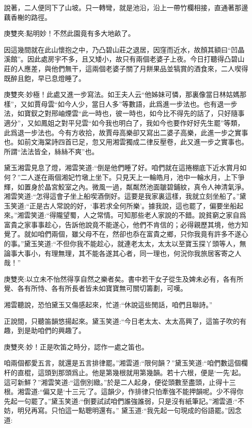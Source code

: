 \begin{parag}
    說著，二人便同下了山坡。只一轉彎，就是池沿，沿上一帶竹欄相接，直通著那邊藕香榭的路徑。\begin{note}庚雙夾:點明妙！不然此園竟有多大地畝了。\end{note}因這幾間就在此山懷抱之中，乃凸碧山莊之退居，因窪而近水，故顏其額曰“凹晶溪館”。因此處房宇不多，且又矮小，故只有兩個老婆子上夜。今日打聽得凸碧山莊的人應差，與他們無干，這兩個老婆子關了月餅果品並犒賞的酒食來，二人喫得既醉且飽，早已息燈睡了。\begin{note}庚雙夾:妙極！此處又進一步寫法。如王夫人云“他姊妹可憐，那裏像當日林姑媽那樣”，又如賈母雲“如今人少，當日人多”等數語，此爲進一步法也。也有退一步法，如寶釵之對邢岫煙雲“此一時也，彼一時也，如今比不得先的話了，只好隨事適分”，又如鳳姐之對平兒雲“如今我也明白了，我如今也要作好好先生罷”等類，此爲退一步法也。今有方收拾，故賈母高樂卻又寫出二婆子高樂，此進一步之實事也。如前文海棠詩四首已足，忽又用湘雲獨成二律反壓卷，此又進一步之實事也。所謂“法法皆全，絲絲不爽”也。\end{note}
\end{parag}


\begin{parag}
    黛玉湘雲見息了燈，湘雲笑道:“倒是他們睡了好。咱們就在這捲棚底下近水賞月如何？”二人遂在兩個湘妃竹墩上坐下。只見天上一輪皓月，池中一輪水月，上下爭輝，如置身於晶宮鮫室之內。微風一過，粼粼然池面皺碧鋪紋，真令人神清氣淨。湘雲笑道:“怎得這會子坐上船喫酒倒好。這要是我家裏這樣，我就立刻坐船了。”黛玉笑道:“正是古人常說的好，‘事若求全何所樂’。據我說，這也罷了，偏要坐船起來。”湘雲笑道:“得隴望蜀，人之常情。可知那些老人家說的不錯。說貧窮之家自爲富貴之家事事趁心，告訴他說竟不能遂心，他們不肯信的；必得親歷其境，他方知覺了。就如咱們兩個，雖父母不在，然卻也忝在富貴之鄉，只你我竟有許多不遂心的事。”黛玉笑道:“不但你我不能趁心，就連老太太，太太以至寶玉探丫頭等人，無論事大事小，有理無理，其不能各遂其心者，同一理也，何況你我旅居客寄之人哉！”\begin{note}庚雙夾:以立未不怡然得享自然之樂者矣。書中若干女子從生及婢未必有，各有所覺、各有所恃、各有所長者皆未如寶寶無可關切籌劃，可嘆。\end{note}湘雲聽說，恐怕黛玉又傷感起來，忙道:“休說這些閒話，咱們且聯詩。”
\end{parag}


\begin{parag}
    正說間，只聽笛韻悠揚起來。黛玉笑道:“今日老太太、太太高興了，這笛子吹的有趣，到是助咱們的興趣了。\begin{note}庚雙夾:妙！正是吹笛之時分，認作一處之笛也。\end{note}咱兩個都愛五言，就還是五言排律罷。”湘雲道:“限何韻？”黛玉笑道:“咱們數這個欄杆的直棍，這頭到那頭爲止。他是第幾根就用第幾韻。若十六根，便是‘一先’起。這可新鮮？”湘雲笑道:“這倒別緻。”於是二人起身，便從頭數至盡頭，止得十三根。湘雲道:“偏又是‘十三元’了。這韻少，作排律只怕牽強不能押韻呢。少不得你先起一句罷了。”黛玉笑道:“倒要試試咱們誰強誰弱，只是沒有紙筆記。”湘雲道:“不妨，明兒再寫。只怕這一點聰明還有。” 黛玉道:“我先起一句現成的俗語罷。”因念道:
\end{parag}


